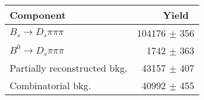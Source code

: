  \begin{tabular}{l r }
\hline\hline
Component & Yield\ \\
\hline
$B_s \to D_s \pi \pi \pi$ & 104176 $\pm$ 356 \\
$B^{0} \to D_s \pi \pi \pi$ & 1742 $\pm$ 363 \\
Partially reconstructed bkg. & 43157 $\pm$ 407 \\
Combinatorial bkg. & 40992 $\pm$ 455 \\
\hline\hline
\end{tabular}
\label{table:normYields}
